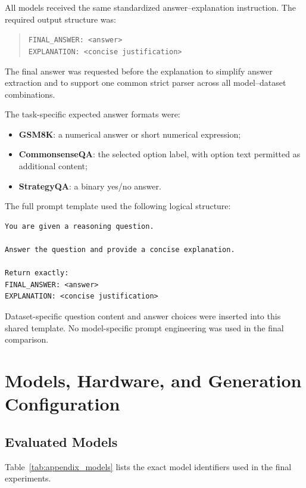 \documentclass{article}
\begin{document}
All models received the same standardized answer--explanation instruction.
The required output structure was:

\begin{quote}
\texttt{FINAL\_ANSWER: <answer>}\\
\texttt{EXPLANATION: <concise justification>}
\end{quote}

The final answer was requested before the explanation to simplify answer
extraction and to support one common strict parser across all model--dataset
combinations.

The task-specific expected answer formats were:

\begin{itemize}
    \item \textbf{GSM8K}: a numerical answer or short numerical expression;
    \item \textbf{CommonsenseQA}: the selected option label, with option text
    permitted as additional content;
    \item \textbf{StrategyQA}: a binary yes/no answer.
\end{itemize}

The full prompt template used the following logical structure:

\begin{verbatim}
You are given a reasoning question.

Answer the question and provide a concise explanation.

Return exactly:
FINAL_ANSWER: <answer>
EXPLANATION: <concise justification>
\end{verbatim}

Dataset-specific question content and answer choices were inserted into this
shared template. No model-specific prompt engineering was used in the final
comparison.

\section{Models, Hardware, and Generation Configuration}
\label{app:configuration}

\subsection{Evaluated Models}

Table~\ref{tab:appendix_models} lists the exact model identifiers used in the
final experiments.
\end{document}
